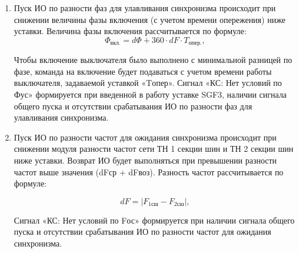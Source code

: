 \begin{enumerate}
\item
Пуск ИО по разности фаз для улавливания синхронизма происходит при снижении величины фазы включения (с учетом времени опережения) ниже уставки. Величина фазы включения рассчитывается по формуле:
\begin{equation*}
   \Phi_{\text{вкл.}}= d\Phi +  360 \cdot dF \cdot T_{\text{опер.}},
\end{equation*}
Чтобы включение выключателя было выполнено с минимальной разницей по фазе, команда на включение будет подаваться с учетом времени работы выключателя, задаваемой уставкой «Tопер».
Сигнал «КС: Нет условий по Фус» формируется при введенной в работу уставке SGF3, наличии сигнала общего пуска и отсутствии срабатывания ИО по разности фаз для улавливания синхронизма.

\item
Пуск ИО по разности частот для ожидания синхронизма происходит при снижении модуля разности частот сети ТН 1 секции шин и ТН 2 секции шин ниже уставки. Возврат ИО будет выполняться при превышении разности частот выше значения (dFср + dFвоз). Разность частот рассчитывается по формуле:

\begin{equation*}
    dF= \lvert F_{\text{1сш}} - F_{\text{2сш}} \rvert ,
 \end{equation*}
 Сигнал «КС: Нет условий по Fос» формируется при наличии сигнала общего пуска и отсутствии срабатывания ИО по разности частот для ожидания синхронизма.


\end{enumerate}
